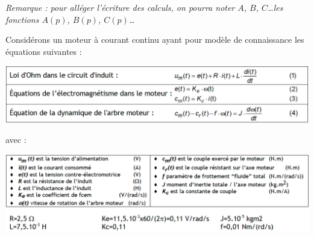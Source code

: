 \textit{Remarque : pour alléger l'écriture des calculs, on pourra noter $A$, $B$, $C$\dots les fonctions $A(p)$, $B(p)$, $C(p)$\dots}

\correction{ %
\[\frac{S}{E}=\frac{(A+B).C.D.F}{1+D+(A+B).C.D.F.G}\]
}
\newpage


Considérons un moteur à courant continu ayant pour modèle de connaissance les équations suivantes :

\begin{center}
\includegraphics[scale=0.4]{png/MCC_data1.png}
\end{center}

avec :

\begin{center}
\includegraphics[scale=0.4]{png/MCC_data2.png}
\end{center}

